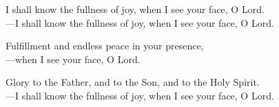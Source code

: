 \responsory

\noindent I shall know the fullness of joy, when I see your face, O Lord.\\
{\color{red}---\thinspace}I shall know the fullness of joy, when I see your face, O Lord.

\medskip\noindent Fulfillment and endless peace in your presence,\\
{\color{red}---\thinspace}when I see your face, O Lord.

\medskip\noindent Glory to the Father, and to the Son, and to the Holy Spirit.\\
{\color{red}---\thinspace}I shall know the fullness of joy, when I see your face, O Lord.